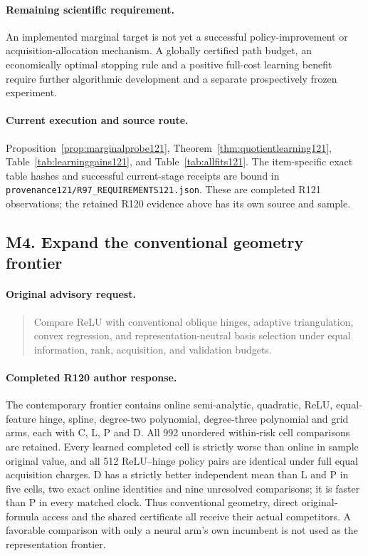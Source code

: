 \paragraph{Remaining scientific requirement.}
An implemented marginal target is not yet a successful policy-improvement or acquisition-allocation mechanism. A globally certified path budget, an economically optimal stopping rule and a positive full-cost learning benefit require further algorithmic development and a separate prospectively frozen experiment.

\paragraph{Current execution and source route.}
Proposition~\ref{prop:marginalprobe121}, Theorem~\ref{thm:quotientlearning121}, Table~\ref{tab:learninggains121}, and Table~\ref{tab:allfits121}.
The item-specific exact table hashes and successful current-stage receipts are bound in \nolinkurl{provenance121/R97_REQUIREMENTS121.json}. These are completed R121 observations; the retained R120 evidence above has its own source and sample.

\subsection{M4. Expand the conventional geometry frontier}
\label{response121:M4}

\paragraph{Original advisory request.}
\begin{quote}
Compare ReLU with conventional oblique hinges, adaptive triangulation, convex regression, and representation-neutral basis selection under equal information, rank, acquisition, and validation budgets.
\end{quote}

\paragraph{Completed R120 author response.}
The contemporary frontier contains online semi-analytic, quadratic, ReLU, equal-feature hinge, spline, degree-two polynomial, degree-three polynomial and grid arms, each with C, L, P and D. All 992 unordered within-risk cell comparisons are retained. Every learned completed cell is strictly worse than online in sample original value, and all 512 ReLU--hinge policy pairs are identical under full equal acquisition charges. D has a strictly better independent mean than L and P in five cells, two exact online identities and nine unresolved comparisons; it is faster than P in every matched clock. Thus conventional geometry, direct original-formula access and the shared certificate all receive their actual competitors. A favorable comparison with only a neural arm's own incumbent is not used as the representation frontier.

